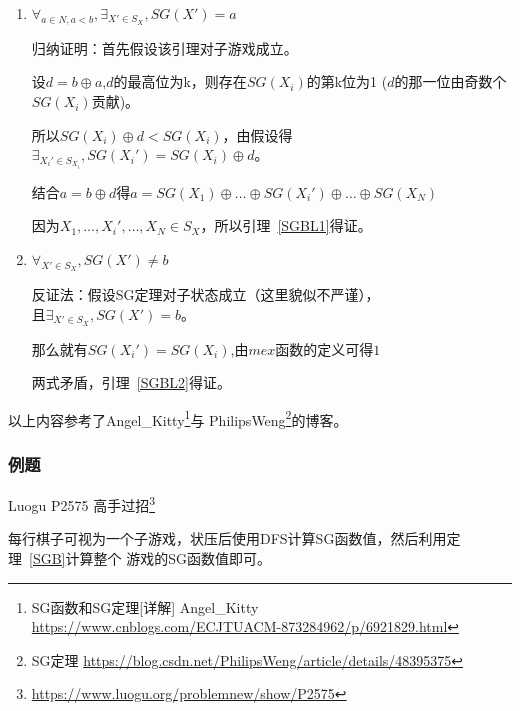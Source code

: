 \begin{enumerate}
	\item
	      \begin{Lemma}\label{SGBL1}
		      $\forall_{a\in N,a<b},\exists_{X'\in S_X},SG(X')=a$
	      \end{Lemma}

	      归纳证明：首先假设该引理对子游戏成立。

	      设$d=b\oplus a$,$d$的最高位为k，则存在$SG(X_i)$的第k位为1
	      ($d$的那一位由奇数个$SG(X_i)$贡献)。

	      所以$SG(X_i)\oplus d<SG(X_i)$，由假设得$\exists_{X_i'\in
			      S_{X_i}},SG(X_i')=SG(X_i)\oplus d$。

	      结合$a=b\oplus d$得$a=SG(X_1)\oplus \ldots \oplus SG(X_i')
		      \oplus \ldots \oplus SG(X_N)$

	      因为$X_1,\ldots,X_i',\ldots,X_N\in S_X$，所以引理~\ref{SGBL1}得证。

	\item
	      \begin{Lemma}\label{SGBL2}
		      $\forall_{X'\in S_X},SG(X')\not=b$
	      \end{Lemma}

	      反证法：假设SG定理对子状态成立（这里貌似不严谨），\\且$\exists_{X' \in S_X},SG(X')=b$。

	      那么就有$SG(X_i')=SG(X_i)$,由$mex$函数的定义可得$1$

	      两式矛盾，引理~\ref{SGBL2}得证。

\end{enumerate}

以上内容参考了Angel\_Kitty\footnote{SG函数和SG定理[详解] Angel\_Kitty
\url{https://www.cnblogs.com/ECJTUACM-873284962/p/6921829.html}}与
PhilipsWeng\footnote{SG定理
	\url{https://blog.csdn.net/PhilipsWeng/article/details/48395375}}的博客。

\subsubsection{例题}

Luogu P2575 高手过招\footnote{\url{https://www.luogu.org/problemnew/show/P2575}}

每行棋子可视为一个子游戏，状压后使用DFS计算SG函数值，然后利用定理~\ref{SGB}计算整个
游戏的SG函数值即可。


